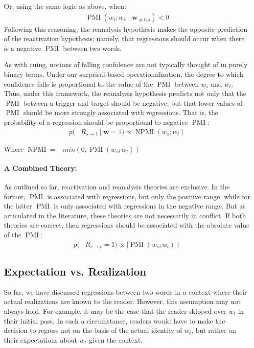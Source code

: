 \documentclass[12pt]{article}
\newcommand{\targetindex}{t}
\newcommand{\sourceindex}{s}
\newcommand{\bothindex}{\targetindex, \sourceindex}
\newcommand{\target}{$w_{\targetindex}$\xspace}
\newcommand{\targetmath}{w_{\targetindex}}
\newcommand{\source}{$w_{\sourceindex}$\xspace}
\newcommand{\sourcemath}{w_{\sourceindex}\xspace}
\newcommand{\bw}{\mathbf{w}}
\newcommand{\maskbothmath}{\bw_{\neq \bothindex}}
\newcommand{\regressionmath}{R_{\sourceindex \rightarrow \targetindex}}
\newcommand{\pmimath}{\operatorname{PMI}}
\newcommand{\pmi}{$\pmimath$\xspace}
\newcommand{\npmimath}{\operatorname{NPMI}}
\begin{document}
\noindent Or, using the same logic as above, when:
%
\begin{align}
    \pmimath(\targetmath;\sourcemath \mid \maskbothmath) < 0
\end{align}
Following this reasoning, the reanalysis hypothesis makes the opposite prediction of the reactivation hypothesis; namely, that regressions should occur when there is a negative \pmi between two words. 

As with cuing, notions of falling confidence are not typically thought of in purely binary terms. Under our surprisal-based operationalization, the degree to which confidence falls is proportional to the value of the \pmi between \source and \target. Thus, under this framework, the reanalysis hypothesis predicts not only that the \pmi between a trigger and target should be negative, but that lower values of \pmi should be more strongly associated with regressions. That is, the probability of a regression should be proportional to negative \pmi :
%
\begin{align}
    p(&\regressionmath \mid \bw = 1) \propto \npmimath(\sourcemath;\targetmath)
\end{align}

\noindent Where $\npmimath = -min(0, \pmimath(\sourcemath;\targetmath))$ 

\paragraph{A Combined Theory:} \label{sec:combined-theory} As outlined so far, reactivation and reanalysis theories are exclusive. In the former, \pmi is associated with regressions, but only the positive range, while for the latter \pmi is only associated with regressions in the negative range. But as articulated in the literature, these theories are not necessarily in conflict. If both theories are correct, then regressions should be associated with the absolute value of the \pmi:
%
\begin{align}
    p(&\regressionmath = 1) \propto \mid \pmimath(\sourcemath;\targetmath) \mid
\end{align}

\subsection{Expectation vs. Realization} \label{sec:expectation}

So far, we have discussed regressions between two words in a context where their actual realizations are known to the reader. However, this assumption may not always hold. For example, it may be the case that the reader skipped over \target in their initial pass. In such a circumstance, readers would have to make the decision to regress not on the basis of the actual identity of \target, but rather on their expectations about \target given the context.
\end{document}
